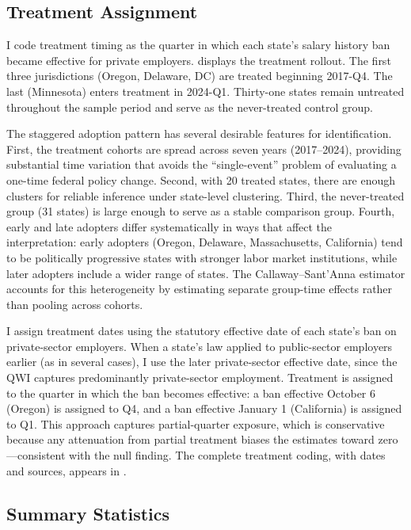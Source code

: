 \documentclass[12pt]{article}
\begin{document}
\subsection{Treatment Assignment}

I code treatment timing as the quarter in which each state's salary history ban became effective for private employers.  displays the treatment rollout. The first three jurisdictions (Oregon, Delaware, DC) are treated beginning 2017-Q4. The last (Minnesota) enters treatment in 2024-Q1. Thirty-one states remain untreated throughout the sample period and serve as the never-treated control group.

The staggered adoption pattern has several desirable features for identification. First, the treatment cohorts are spread across seven years (2017--2024), providing substantial time variation that avoids the ``single-event'' problem of evaluating a one-time federal policy change. Second, with 20 treated states, there are enough clusters for reliable inference under state-level clustering. Third, the never-treated group (31 states) is large enough to serve as a stable comparison group. Fourth, early and late adopters differ systematically in ways that affect the interpretation: early adopters (Oregon, Delaware, Massachusetts, California) tend to be politically progressive states with stronger labor market institutions, while later adopters include a wider range of states. The Callaway--Sant'Anna estimator accounts for this heterogeneity by estimating separate group-time effects rather than pooling across cohorts.

I assign treatment dates using the statutory effective date of each state's ban on private-sector employers. When a state's law applied to public-sector employers earlier (as in several cases), I use the later private-sector effective date, since the QWI captures predominantly private-sector employment. Treatment is assigned to the quarter in which the ban becomes effective: a ban effective October 6 (Oregon) is assigned to Q4, and a ban effective January 1 (California) is assigned to Q1. This approach captures partial-quarter exposure, which is conservative because any attenuation from partial treatment biases the estimates toward zero---consistent with the null finding. The complete treatment coding, with dates and sources, appears in .

\subsection{Summary Statistics}
\end{document}
